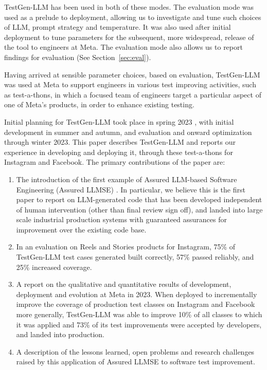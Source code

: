 \documentclass[sigconf,screen]{acmart}
\begin{document}
TestGen-LLM has been used in both of these modes.
The evaluation mode was used as a prelude to deployment, allowing us to investigate and tune such choices of LLM, prompt strategy and temperature.
It was also used after initial deployment to tune parameters for the subsequent, more widespread, release of the tool to engineers at Meta.
The evaluation mode also allows us to report findings for evaluation (See Section~\ref{sec:eval}).


Having arrived at sensible parameter choices, based on evaluation, TestGen-LLM was  used at Meta to support engineers in various test improving activities, such as test-a-thons, in which a focused team of engineers target a particular aspect of one of Meta's products, in order to enhance existing testing.

Initial planning for TestGen-LLM took place in spring 2023 \cite{alshahwan:software}, with initial development in summer and autumn, and evaluation and onward optimization through winter 2023.
This paper describes TestGen-LLM and reports our experience in developing and deploying it, through these test-a-thons for Instagram and Facebook.
The primary contributions of the paper are:

\begin{enumerate}
    \item The introduction of the first example of Assured LLM-based Software Engineering (Assured LLMSE) \cite{mhetal:intense24-keynote}. 
    In particular, we believe this is the first paper to report on LLM-generated code that has been developed independent of human intervention (other than final review sign off), and landed into large scale industrial production systems with guaranteed assurances for improvement over the existing code base.
    \item In an evaluation on Reels and Stories products for Instagram, 75\% of TestGen-LLM  test cases generated  built correctly, 57\% passed reliably, and 25\% increased coverage.
    \item A report on the qualitative and quantitative results of development, deployment and evolution at Meta in 2023. When deployed to incrementally improve the coverage of production test classes on Instagram and Facebook more generally, 
    TestGen-LLM was able to improve 10\% of all classes to which it was applied and 73\% of its test improvements were accepted by developers, and landed into production.
    \item A description of the lessons learned,  open problems and research challenges raised by this application of Assured LLMSE to software test improvement. 
    
\end{enumerate}
\end{document}
